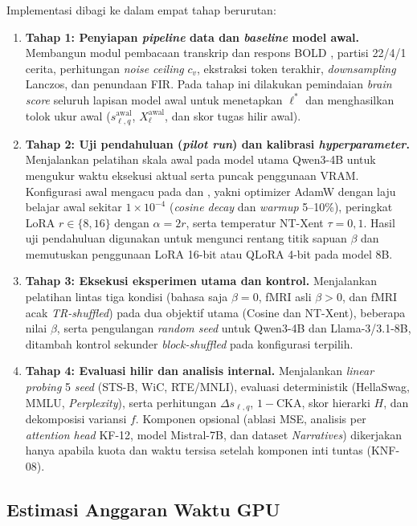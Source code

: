 Implementasi dibagi ke dalam empat tahap berurutan:
\begin{enumerate}
  \item \textbf{Tahap 1: Penyiapan \textit{pipeline} data dan \textit{baseline} model awal.} Membangun modul pembacaan transkrip dan respons BOLD \textcite{lebel2023natural}, partisi 22/4/1 cerita, perhitungan \textit{noise ceiling} $c_v$, ekstraksi token terakhir, \textit{downsampling} Lanczos, dan penundaan FIR. Pada tahap ini dilakukan pemindaian \textit{brain score} seluruh lapisan model awal untuk menetapkan $\ell^*$ dan menghasilkan tolok ukur awal ($s^{\text{awal}}_{\ell,q}$, $X^{\text{awal}}_\ell$, dan skor tugas hilir awal).
  \item \textbf{Tahap 2: Uji pendahuluan (\textit{pilot run}) dan kalibrasi \textit{hyperparameter}.} Menjalankan pelatihan skala awal pada model utama Qwen3-4B untuk mengukur waktu eksekusi aktual serta puncak penggunaan VRAM. Konfigurasi awal mengacu pada \textcite{xiao2026beyond} dan \textcite{negi2025brain}, yakni optimizer AdamW dengan laju belajar awal sekitar $1 \times 10^{-4}$ (\textit{cosine decay} dan \textit{warmup} 5--10\%), peringkat LoRA $r \in \{8, 16\}$ dengan $\alpha = 2r$, serta temperatur NT-Xent $\tau = 0{,}1$. Hasil uji pendahuluan digunakan untuk mengunci rentang titik sapuan $\beta$ dan memutuskan penggunaan LoRA 16-bit atau QLoRA 4-bit pada model 8B.
  \item \textbf{Tahap 3: Eksekusi eksperimen utama dan kontrol.} Menjalankan pelatihan lintas tiga kondisi (bahasa saja $\beta=0$, fMRI asli $\beta>0$, dan fMRI acak \textit{TR-shuffled}) pada dua objektif utama (Cosine dan NT-Xent), beberapa nilai $\beta$, serta pengulangan \textit{random seed} untuk Qwen3-4B dan Llama-3/3.1-8B, ditambah kontrol sekunder \textit{block-shuffled} pada konfigurasi terpilih.
  \item \textbf{Tahap 4: Evaluasi hilir dan analisis internal.} Menjalankan \textit{linear probing} 5 \textit{seed} (STS-B, WiC, RTE/MNLI), evaluasi deterministik (HellaSwag, MMLU, \textit{Perplexity}), serta perhitungan $\Delta s_{\ell,q}$, $1-\text{CKA}$, skor hierarki $H$, dan dekomposisi variansi $f$. Komponen opsional (ablasi MSE, analisis per \textit{attention head} KF-12, model Mistral-7B, dan dataset \textit{Narratives}) dikerjakan hanya apabila kuota dan waktu tersisa setelah komponen inti tuntas (KNF-08).
\end{enumerate}

\subsection{Estimasi Anggaran Waktu GPU}
\label{sub:rs_anggaran_gpu}

